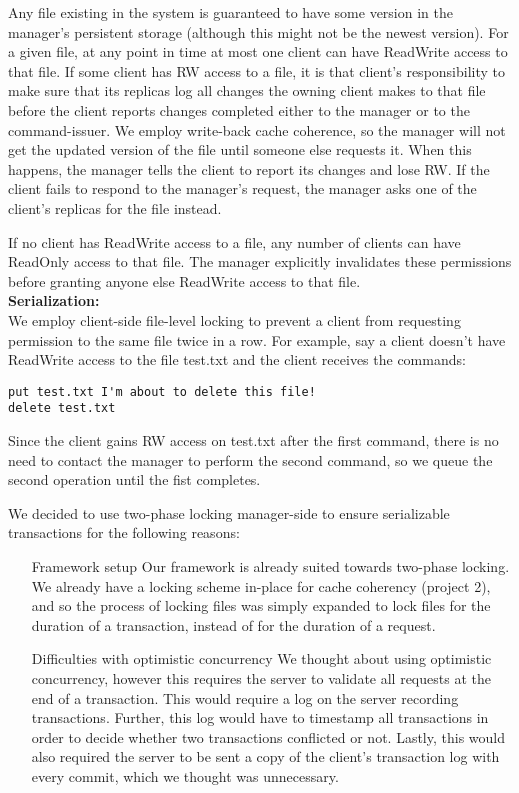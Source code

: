 \documentclass[11pt]{article}
\begin{document}
Any file existing in the system is guaranteed to have some version in the manager's persistent storage (although this might not be the newest version).
For a given file, at any point in time at most one client can have ReadWrite access to that file.
If some client has RW access to a file, it is that client's responsibility to make sure that its replicas log all changes the owning client
makes to that file before the client reports changes completed either to the manager or to the command-issuer.
We employ write-back cache coherence, so the manager will not get the updated version of the file until someone else requests it.
When this happens, the manager tells the client to report its changes and lose RW.
If the client fails to respond to the manager's request, the manager asks one of the client's replicas for the file instead.

If no client has ReadWrite access to a file, any number of clients can have ReadOnly access to that file.
The manager explicitly invalidates these permissions before granting anyone else ReadWrite access to that file. \\

\textbf{Serialization:} \\

We employ client-side file-level locking to prevent a client from requesting permission to the same file twice in a row.
For example, say a client doesn't have ReadWrite access to the file test.txt and the client receives the commands:

\begin{verbatim}
put test.txt I'm about to delete this file!
delete test.txt
\end{verbatim}

Since the client gains RW access on test.txt after the first command, there is no need to contact the manager to perform the second command, so we queue the second operation until the fist completes.

We decided to use two-phase locking manager-side to ensure serializable transactions for the following reasons:

\begin{enumerate}
	\item[Framework setup] Our framework is already suited towards two-phase locking. We already have a locking scheme in-place for cache coherency (project 2), and so the process of locking files was 
simply expanded to lock files for the duration of a transaction, instead of for the duration of a request.
	\item[Difficulties with optimistic concurrency] We thought about using optimistic concurrency, however this requires the server to validate all requests at the end of a transaction. This would require
a log on the server recording transactions. Further, this log would have to timestamp all transactions in order to decide whether two transactions conflicted or not. Lastly, this would also required the
server to be sent a copy of the client's transaction log with every commit, which we thought was unnecessary.
\end{enumerate}
\end{document}
